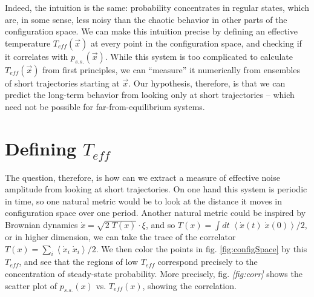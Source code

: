 \documentclass[11pt]{article}
\renewcommand{\v}[1]{\ensuremath{\vec{#1}}} %
\renewcommand{\=}[1]{\stackrel{#1}{=}} %
\renewcommand{\(}{\left (}
\renewcommand{\)}{\right  )}
\renewcommand{\[}{\left [}
\renewcommand{\]}{\right ]}
\newcommand{\<}{\left <}
\renewcommand{\>}{\right >}
\theoremstyle{definition}
\theoremstyle{remark}
\renewcommand{\todo}[1]{\textit{\color{red}[#1]}}
\begin{document}
Indeed, the intuition is the same: probability concentrates in regular states, which are, in some sense, less noisy than the chaotic behavior in other parts of the configuration space. We can make this intuition precise by defining an effective temperature $ T_{eff}(\v{x}) $ at every point in the configuration space, and checking if it correlates with $ p_{s.s.}(\v{x}) $. While this system is too complicated to calculate $ T_{eff} (\v{x})$ from first principles, we can ``measure'' it numerically from ensembles of short trajectories starting at $ \v{x} $. Our hypothesis, therefore, is that we can predict the long-term behavior from looking only at short trajectories -- which need not be possible for far-from-equilibrium systems. 


\section{Defining $ T_{eff} $}
The question, therefore, is how can we extract a measure of effective noise amplitude from looking at short trajectories. On one hand this system is periodic in time, so one natural metric would be to look at the distance it moves in configuration space over one period. Another natural metric could be inspired by Brownian dynamics $ \dot{x}=\sqrt{2\;T(x)}\cdot\xi $, and so $ T(x)=\int dt\;\<\dot{x}(t)\;\dot{x}(0)\>/2 $, or in higher dimension, we can take the trace of the correlator $ T(x)=\sum_i\<\dot{x}_i\;\dot{x}_i\>/2 $. 
We then color the points in fig. \ref{fig:configSpace} by this $ T_{eff} $, and see that the regions of low $ T_{eff} $ correspond precisely to the concentration of steady-state probability. More precisely, fig. \todo{fig:corr} shows the scatter plot of $ p_{s.s.}(x) $ vs. $ T_{eff}(x) $, showing the correlation.
\end{document}
